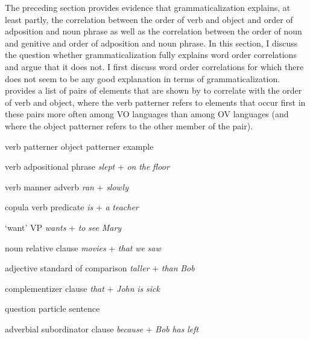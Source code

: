 \documentclass[output=paper]{langsci/langscibook}
\begin{document}
The preceding section provides evidence that grammaticalization explains, at least partly, the correlation between the order of verb and object and order of adposition and noun phrase as well as the correlation between the order of noun and genitive and order of adposition and noun phrase. In this section, I discuss the question whether grammaticalization fully explains word order correlations and argue that it does not. I first discuss word order correlations for which there does not seem to be any good explanation in terms of grammaticalization.  provides a list of pairs of elements that are shown by \citet{Dryer1992} to correlate with the order of verb and object, where the verb patterner refers to elements that occur first in these pairs more often among VO languages than among OV languages (and where the object patterner refers to the other member of the pair).

\begin{table}

verb patterner  object patterner  example



  verb  adpositional phrase  \textit{slept} + \textit{on} \textit{the} \textit{floor}



  verb  manner adverb  \textit{ran} + \textit{slowly}



  copula verb  predicate  \textit{is} + \textit{a} \textit{teacher}



  ‘want'  VP  \textit{wants} + \textit{to} \textit{see} \textit{Mary}



  noun  relative clause  \textit{movies} + \textit{that} \textit{we} \textit{saw}



  adjective  standard of comparison  \textit{taller} + \textit{than} \textit{Bob}



  complementizer  clause  \textit{that} + \textit{John} \textit{is} \textit{sick}



  question particle  sentence  



  adverbial subordinator  clause  \textit{because} + \textit{Bob} \textit{has} \textit{left}


\caption{Pairs of elements that correlate with the order of verb and object}
\end{table}
\end{document}
